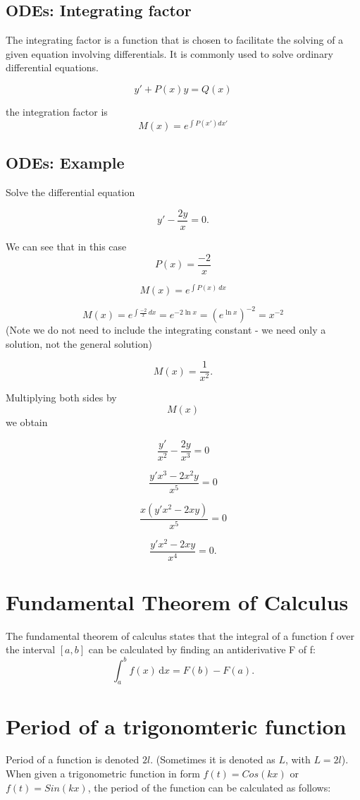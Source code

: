 \documentclass[12pt, a4paper]{article}
\begin{document}
\subsection{ODEs: Integrating factor}
The integrating factor is a function that is chosen to facilitate the solving of a given equation involving differentials. It is commonly used to solve ordinary differential equations.

\[ y'+ P(x)y = Q(x)\]

the integration factor is
\[M(x) = e^{\int P(x') dx'}\]


\subsection*{ODEs: Example}

Solve the differential equation

\[y'-\frac{2y}{x} = 0.\]

We can see that in this case \[P(x) = \frac{-2}{x}\]

\[ M(x)=e^{\int P(x)\,dx}\]

\[ M(x)=e^{\int \frac{-2}{x}\,dx} = e^{-2 \ln x} = {(e^{\ln x})}^{-2} = x^{-2} \] (Note we do not need to include the integrating constant - we need only a solution, not the general solution)

\[ M(x)=\frac{1}{x^2}.\]

Multiplying both sides by \[M(x)\] we obtain

\[\frac{y'}{x^2} - \frac{2y}{x^3} = 0\]

\[\frac{y'x^3 - 2x^2y}{x^5} = 0\]

\[\frac{x(y'x^2 - 2xy)}{x^5} = 0\]

\[\frac{y'x^2 - 2xy}{x^4} = 0.\]



\section{Fundamental Theorem of Calculus}
The fundamental theorem of calculus states that the integral of a function f over the interval $[a, b]$ can be calculated by finding an antiderivative F of f:
\[\int_a^b f(x)\,\mathrm dx = F(b) - F(a).\]



\section{Period of a trigonomteric function}
Period of a function is denoted $2l$. (Sometimes it is denoted as
$L$, with $L=2l$). \newline When given a trigonometric function in
form $f(t) = Cos(kx)$ or $f(t)= Sin(kx)$, the period of the
function can be calculated as follows:
\end{document}
